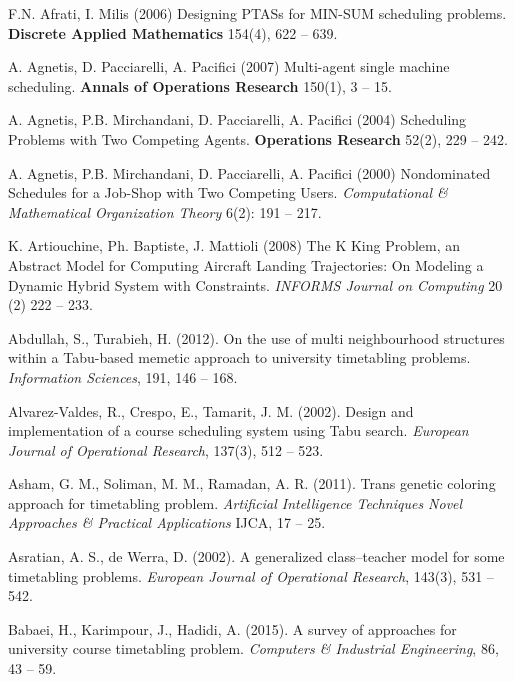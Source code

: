 \documentclass[11pt]{article}
\begin{document}
%
\begin{thebibliography}{19}

F.N. Afrati, I. Milis (2006) 
Designing PTASs for MIN-SUM scheduling problems. 
\textbf{Discrete Applied Mathematics} 154(4), 622 -- 639.

A. Agnetis, D. Pacciarelli, A. Pacifici (2007) 
Multi-agent single machine scheduling. 
\textbf{Annals of Operations Research} 150(1), 3 -- 15.

A. Agnetis, P.B. Mirchandani, D. Pacciarelli, A. Pacifici (2004) 
Scheduling Problems with Two Competing Agents. 
\textbf{Operations Research} 52(2), 229 -- 242.

A. Agnetis, P.B. Mirchandani, D. Pacciarelli, A. Pacifici (2000) 
Nondominated Schedules for a Job-Shop with Two Competing Users. 
\textit{Computational \& Mathematical Organization Theory} 6(2): 191 -- 217.

K. Artiouchine, Ph. Baptiste, J. Mattioli (2008) 
The K King Problem, an Abstract Model for Computing Aircraft Landing Trajectories: On Modeling a Dynamic Hybrid System with Constraints. \textit{INFORMS Journal on Computing} 20 (2) 222 -- 233. 

Abdullah, S., Turabieh, H. (2012). 
On the use of multi neighbourhood structures within a Tabu-based memetic approach to university timetabling problems. 
\textit{Information Sciences}, 191, 146 -- 168.

Alvarez-Valdes, R., Crespo, E., Tamarit, J. M. (2002). 
Design and implementation of a course scheduling system using Tabu search. 
\textit{European Journal of Operational Research}, 137(3), 512 -- 523.

Asham, G. M., Soliman, M. M., Ramadan, A. R. (2011). 
Trans genetic coloring approach for timetabling problem. 
\textit{Artificial Intelligence Techniques Novel Approaches \& Practical Applications} IJCA, 17 -- 25.

Asratian, A. S., de Werra, D. (2002). 
A generalized class–teacher model for some timetabling problems. 
\textit{European Journal of Operational Research}, 143(3), 531 -- 542.

Babaei, H., Karimpour, J., Hadidi, A. (2015). 
A survey of approaches for university course timetabling problem. 
\textit{Computers \& Industrial Engineering}, 86, 43 -- 59.


\end{thebibliography}
\end{document}
